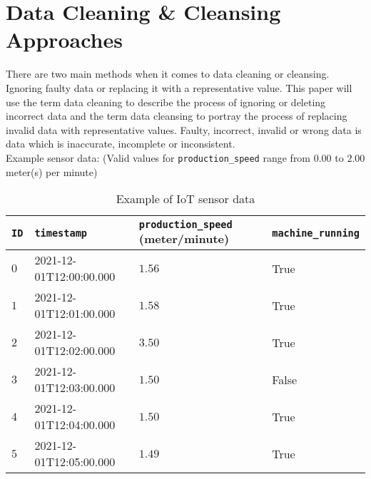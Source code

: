 \section{Data Cleaning \& Cleansing Approaches}\label{section:data-cleaning-cleansing-approaches}
There are two main methods when it comes to data cleaning or cleansing. Ignoring faulty data or replacing it with a representative value. This paper will use the term data cleaning to describe the process of ignoring or deleting incorrect data and the term data cleansing to portray the process of replacing invalid data with representative values. Faulty, incorrect, invalid or wrong data is data which is inaccurate, incomplete or inconsistent.\\
Example sensor data: (Valid values for \verb|production_speed| range from $0.00$ to $2.00$ meter(s) per minute)
\begin{table}[ht]
\begin{tabular}{|l|l|l|l|}
\hline
\verb|ID| & \verb|timestamp|        & \verb|production_speed| (meter/minute) & \verb|machine_running| \\ \hline
$0$       & 2021-12-01T12:00:00.000 & $1.56$                                 & True                   \\ \hline
$1$       & 2021-12-01T12:01:00.000 & $1.58$                                 & True                   \\ \hline
$2$       & 2021-12-01T12:02:00.000 & $3.50$                                 & True                   \\ \hline
$3$       & 2021-12-01T12:03:00.000 & $1.50$                                 & False                  \\ \hline
$4$       & 2021-12-01T12:04:00.000 & $1.50$                                 & True                   \\ \hline
$5$       & 2021-12-01T12:05:00.000 & $1.49$                                 & True                   \\ \hline
\end{tabular}
\caption{Example of IoT sensor data}
\label{table:example-iot-data}
\end{table}
